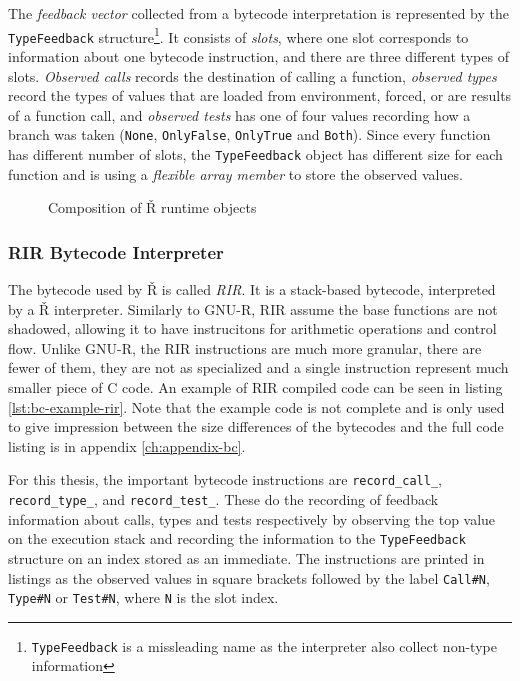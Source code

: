 The \textit{feedback vector} collected from a bytecode interpretation is represented by the \texttt{TypeFeedback} structure\footnote{\texttt{TypeFeedback} is a missleading name as the interpreter also collect non-type information}. It consists of \textit{slots}, where one slot corresponds to information about one bytecode instruction, and there are three different types of slots. \textit{Observed calls} records the destination of calling a function, \textit{observed types} record the types of values that are loaded from environment, forced, or are results of a function call, and \textit{observed tests} has one of four values recording how a branch was taken (\texttt{None}, \texttt{OnlyFalse}, \texttt{OnlyTrue} and \texttt{Both}). Since every function has different number of slots, the \texttt{TypeFeedback} object has different size for each function and is using a \textit{flexible array member}\cite{flexible-array} to store the observed values.

\begin{figure}
	\centering
	\caption{Composition of Ř runtime objects}\label{fig:rsh-composition}
\end{figure}

\subsubsection*{RIR Bytecode Interpreter}

The bytecode used by Ř is called \textit{RIR}. It is a stack-based bytecode, interpreted by a Ř interpreter. Similarly to GNU-R, RIR assume the base functions are not shadowed, allowing it to have instrucitons for arithmetic operations and control flow. Unlike GNU-R, the RIR instructions are much more granular, there are fewer of them, they are not as specialized and a single instruction represent much smaller piece of C code. An example of RIR compiled code can be seen in listing \ref{lst:bc-example-rir}. Note that the example code is not complete and is only used to give impression between the size differences of the bytecodes and the full code listing is in appendix \ref{ch:appendix-bc}.

For this thesis, the important bytecode instructions are \texttt{record\_call\_}, \texttt{record\_type\_}, and \texttt{record\_test\_}. These do the recording of feedback information about calls, types and tests respectively by observing the top value on the execution stack and recording the information to the \texttt{TypeFeedback} structure on an index stored as an immediate. The instructions are printed in listings as the observed values in square brackets followed by the label \texttt{Call\#N}, \texttt{Type\#N} or \texttt{Test\#N}, where \texttt{N} is the slot index.

